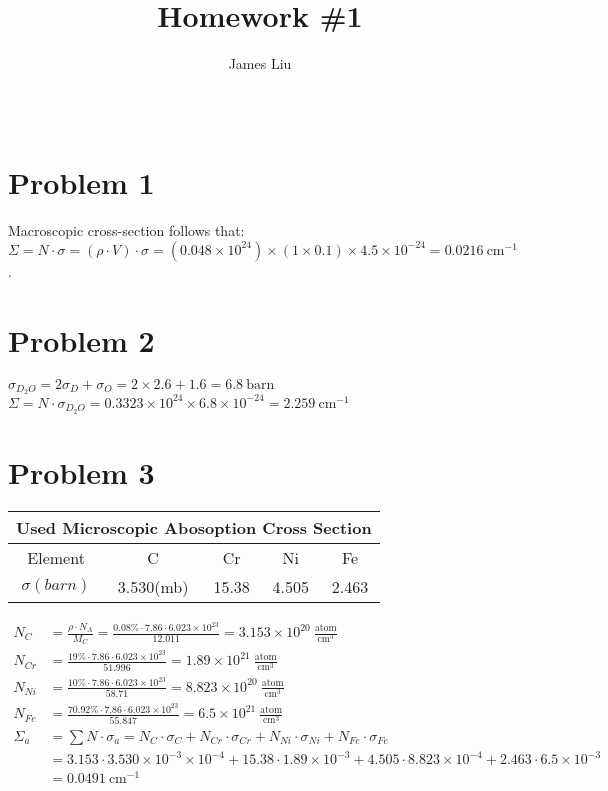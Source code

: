 \documentclass{article}
\title{\textbf{Homework \#1 }}
\author{James Liu}
\date{\ }
\begin{document}
\maketitle

\section*{Problem 1}
    Macroscopic cross-section follows that:\\
    \(\Sigma = N\cdot \sigma= 
    (\rho \cdot V)\cdot \sigma=(0.048\times 10^{24}) \times (1\times 0.1)\times 4.5 \times 10^{-24}
    = 0.0216\ \text{cm}^{-1}\).
\section*{Problem 2}
    \(\displaystyle{\sigma_{D_2O}=2\sigma_D+\sigma_O=2\times 2.6+1.6=6.8\ \text{barn}}\)\\
    \(\Sigma = N\cdot \sigma_{D_2O}=0.3323\times 10^{24}\times 6.8\times 10^{-24}=2.259\ \text{cm}^{-1}\)
\section*{Problem 3}
    \begin{table}[h]
        \centering
        \begin{tabular}{c c c c c}
            \multicolumn{5}{c}{Used Microscopic Abosoption Cross Section}\\ \hline \hline
            Element&C&Cr&Ni&Fe\\\hline
            $\sigma(barn)$ &3.530(mb)&15.38&4.505&2.463\\ \hline
        \end{tabular}
    \end{table}

    \begin{align*}
    N_C &=\displaystyle{\frac {\rho \cdot N_A}{M_C}=\frac{0.08\% \cdot 7.86 \cdot 6.023\times 10^{23}}{12.011}=3.153\times 10^{20}\ \frac {\text{atom}}{\text{cm}^{3}}}\\
    N_{Cr}&=\displaystyle{\frac{19\% \cdot 7.86 \cdot 6.023\times 10^{23}}{51.996}=1.89\times 10^{21}}\ \frac {\text{atom}}{\text{cm}^{3}}\\
    N_{Ni}&=\displaystyle{\frac{10\% \cdot 7.86 \cdot 6.023\times 10^{23}}{58.71}=8.823\times 10^{20}}\ \frac {\text{atom}}{\text{cm}^{3}}\\
    N_{Fe}&=\displaystyle{\frac{70.92\% \cdot 7.86 \cdot 6.023\times 10^{23}}{55.847}=6.5\times 10^{21}}\ \frac {\text{atom}}{\text{cm}^{3}}\\
        \Sigma_a    &= \displaystyle {\sum N\cdot \sigma_a}=N_{C}\cdot \sigma_{C}+N_{Cr}\cdot \sigma_{Cr}+N_{Ni}\cdot \sigma_{Ni}+N_{Fe}\cdot \sigma_{Fe}\\
                    &=3.153\cdot 3.530\times 10^{-3} \times 10^{-4}+15.38\cdot 1.89\times 10^{-3}+4.505\cdot 8.823\times 10^{-4}+2.463\cdot 6.5\times 10^{-3}\\
                    &=0.0491 \ \text{cm}^{-1}                    
    \end{align*}
\end{document}
